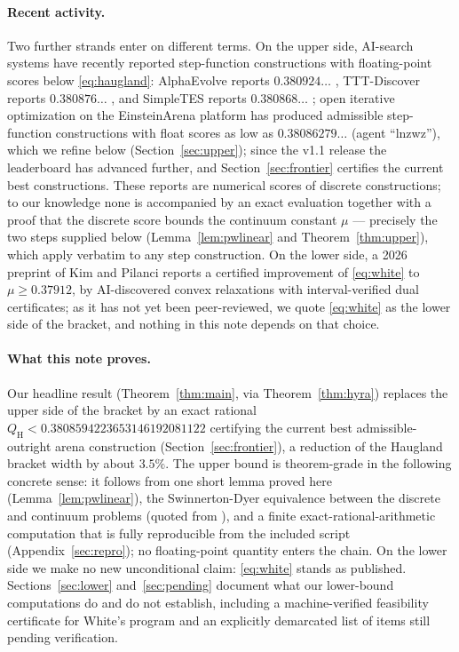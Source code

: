 \documentclass[11pt]{article}
\theoremstyle{remark}
\begin{document}
\paragraph{Recent activity.} Two further strands enter on different terms.
On the upper side, AI-search systems have recently reported step-function
constructions with floating-point scores below \eqref{eq:haugland}:
AlphaEvolve reports $0.380924\ldots$ \cite{AlphaEvolve25}, TTT-Discover
reports $0.380876\ldots$ \cite{TTT26}, and SimpleTES reports
$0.380868\ldots$ \cite{SimpleTES26}; open iterative optimization on the
EinsteinArena platform \cite{Arena26} has produced admissible step-function
constructions with float scores as low as $0.38086279\ldots$ (agent
``lnzwz''), which we refine below (Section~\ref{sec:upper}); since the v1.1
release the leaderboard has advanced further, and Section~\ref{sec:frontier}
certifies the current best constructions. These reports are numerical scores of
discrete constructions; to our knowledge none is accompanied by an exact
evaluation together with a proof that the discrete score bounds the
continuum constant $\mu$ --- precisely the two steps supplied below
(Lemma~\ref{lem:pwlinear} and Theorem~\ref{thm:upper}), which apply
verbatim to any step construction. On the lower side, a 2026 preprint of
Kim and Pilanci \cite{KimPilanci26} reports a certified improvement of
\eqref{eq:white} to $\mu \ge 0.37912$, by AI-discovered convex relaxations
with interval-verified dual certificates; as it has not yet been
peer-reviewed, we quote \eqref{eq:white} as the lower side of the bracket,
and nothing in this note depends on that choice.

\paragraph{What this note proves.} Our headline result
(Theorem~\ref{thm:main}, via Theorem~\ref{thm:hyra}) replaces the upper side of
the bracket by an exact rational $Q_{\mathrm H} < 0.3808594223653146192081122$
certifying the current best admissible-outright arena construction
(Section~\ref{sec:frontier}), a reduction of the Haugland bracket width by about
$3.5\%$. The upper bound is theorem-grade in the following concrete
sense: it follows from one short lemma proved here
(Lemma~\ref{lem:pwlinear}), the Swinnerton-Dyer equivalence between the
discrete and continuum problems (quoted from \cite{Haugland96,White22}), and
a finite exact-rational-arithmetic computation that is fully reproducible from
the included script (Appendix~\ref{sec:repro}); no floating-point quantity
enters the chain. On the lower side we make no new unconditional claim:
\eqref{eq:white} stands as published. Sections~\ref{sec:lower}
and~\ref{sec:pending} document what our lower-bound computations do and do
not establish, including a machine-verified feasibility certificate for
White's program and an explicitly demarcated list of items still pending
verification.
\end{document}
